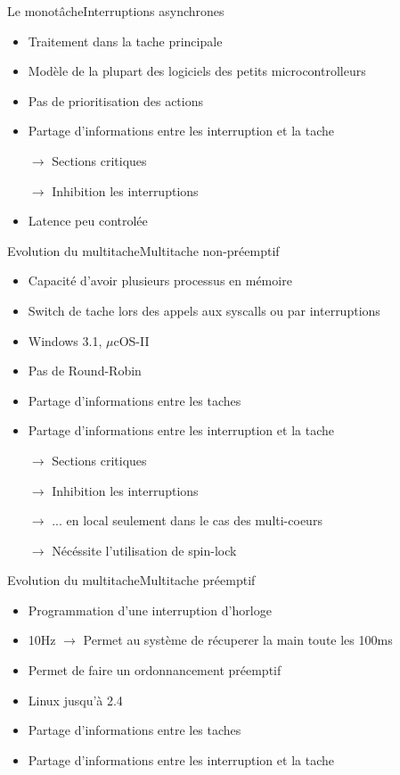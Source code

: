\begin{frame}{Le monotâche}{Interruptions asynchrones}
  \begin{itemize}
    \item Traitement dans la tache principale
    \item Modèle de la plupart des logiciels des petits microcontrolleurs
    \item Pas de prioritisation des actions
    \item Partage d'informations entre les interruption et la tache
    \item[$\to$] Sections critiques
    \item[$\to$] Inhibition les interruptions
    \item Latence peu controlée
  \end{itemize}
\end{frame}

\begin{frame}{Evolution du multitache}{Multitache non-préemptif}
  \begin{itemize}
   \item Capacité d'avoir plusieurs processus en mémoire
   \item Switch de tache lors des appels aux syscalls ou par interruptions
   \item Windows 3.1, $\mu$cOS-II
   \item Pas de Round-Robin
   \item Partage d'informations entre les taches
   \item Partage d'informations entre les interruption et la tache
    \item[$\to$] Sections critiques
    \item[$\to$] Inhibition les interruptions
    \item[$\to$] ... en local seulement dans le cas des multi-coeurs
    \item[$\to$] Nécéssite l'utilisation de spin-lock
  \end{itemize} 
\end{frame}

\begin{frame}{Evolution du multitache}{Multitache préemptif}
  \begin{itemize}
   \item Programmation d'une interruption d'horloge
   \item 10Hz $\to$  Permet au système de récuperer  la main toute les
     100ms
   \item Permet de faire un ordonnancement préemptif
   \item Linux jusqu'à 2.4
   \item Partage d'informations entre les taches
   \item Partage d'informations entre les interruption et la tache
  \end{itemize}
\end{frame}

